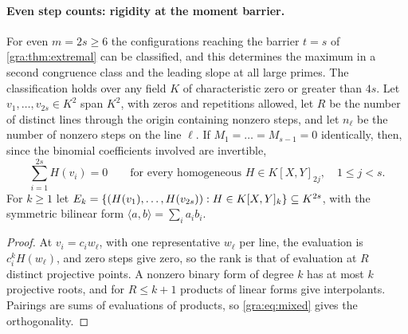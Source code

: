 \paragraph{Even step counts: rigidity at the moment barrier.}
For even $m=2s\ge6$ the configurations reaching the barrier $t=s$ of
\cref{gra:thm:extremal} can be classified, and this determines the maximum
in a second congruence class and the leading slope at all large primes. The
classification holds over any field $K$ of characteristic zero or greater
than $4s$. Let $v_1,\dots,v_{2s}\in K^2$ span $K^2$, with zeros and
repetitions allowed, let $R$ be the number of distinct lines through the
origin containing nonzero steps, and let $n_\ell$ be the number of nonzero
steps on the line $\ell$. If $M_1=\dots=M_{s-1}=0$ identically, then, since
the binomial coefficients involved are invertible,
\begin{equation}\label{gra:eq:mixed}
 \sum_{i=1}^{2s}H(v_i)=0\qquad\text{for every homogeneous }H\in K[X,Y]_{2j},
 \quad 1\le j<s .
\end{equation}
For $k\ge1$ let $E_k=\{(H(v_1),\dots,H(v_{2s})):H\in K[X,Y]_k\}\subseteq K^{2s}$,
with the symmetric bilinear form $\langle a,b\rangle=\sum_ia_ib_i$.


\begin{proof}
At $v_i=c_iw_\ell$, with one representative $w_\ell$ per line, the
evaluation is $c_i^kH(w_\ell)$, and zero steps give zero, so the rank is
that of evaluation at $R$ distinct projective points. A nonzero binary
form of degree $k$ has at most $k$ projective roots, and for $R\le k+1$
products of linear forms give interpolants. Pairings are sums of
evaluations of products, so \eqref{gra:eq:mixed} gives the orthogonality.
\end{proof}



